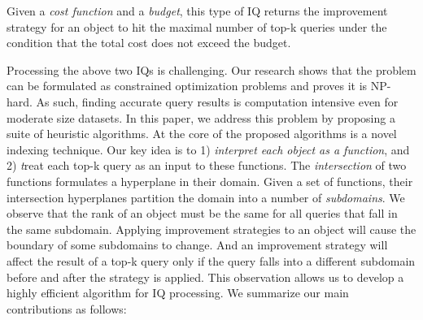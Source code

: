  Given a \textit{cost function} and a \textit{budget}, this type of IQ returns the improvement strategy for an object to hit the maximal number of top-k queries under the condition that the total cost does not exceed the budget. 





Processing the above two IQs is challenging. Our research shows that the problem can be formulated as constrained optimization problems and proves it is NP-hard. As such, finding accurate query results is computation intensive even for moderate size datasets. In this paper, we address this problem by proposing a suite of heuristic algorithms. At the core of the proposed algorithms is a novel indexing technique. Our key idea is to 1) \textit{interpret each object as a function}, and 2) {\textit treat each top-k query as an input to these functions}. The \textit{intersection} of two functions formulates a hyperplane in their domain. Given a set of functions, their intersection hyperplanes partition the domain into a number of \textit{subdomains}. We observe that the rank of an object must be the same for all queries that fall in the same subdomain. Applying improvement strategies to an object will cause the boundary of some subdomains to change. And an improvement strategy will affect the result of a top-k query only if the query falls into a different subdomain before and after the strategy is applied. This observation allows us to develop a highly efficient algorithm for IQ processing. We summarize our main contributions as follows:

